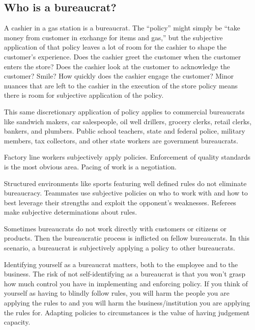 \subsection{Who is a bureaucrat?}

A cashier in a gas station is a bureaucrat. The ``policy'' might simply be ``take money from customer in exchange for items and gas,'' but the subjective application of that policy leaves a lot of room for the cashier to shape the customer's experience. Does the cashier greet the customer when the customer enters the store? Does the cashier look at the customer to acknowledge the customer? Smile? How quickly does the cashier engage the customer? Minor nuances that are left to the cashier in the execution of the store policy means there is room for subjective application of the policy. 

This same discretionary application of policy applies to commercial bureaucrats like sandwich makers, car salespeople, oil well drillers, grocery clerks, retail clerks, bankers, and plumbers. Public school teachers, state and federal police, military members, tax collectors, and other state workers are government bureaucrats. 




Factory line workers subjectively apply policies. Enforcement of quality standards is the most obvious area. Pacing of work is a negotiation.

Structured environments like sports featuring well defined rules do not eliminate bureaucracy. Teammates use subjective policies on who to work with and how to best leverage their strengths and exploit the opponent's weaknesses. Referees make subjective determinations about rules.

Sometimes bureaucrats do not work directly with customers or citizens or products. Then the bureaucratic process is inflicted on fellow bureaucrats. In this scenario, a bureaucrat is subjectively applying a policy to other bureaucrats. 

Identifying yourself as a bureaucrat matters, both to the employee and to the business. The risk of not self-identifying as a bureaucrat is that you won't grasp how much control you have in implementing and enforcing policy. If you think of yourself as having to blindly follow rules, you will harm the people you are applying the rules to and you will harm the business/institution you are applying the rules for. Adapting policies to circumstances is the value of having judgement capacity. 

